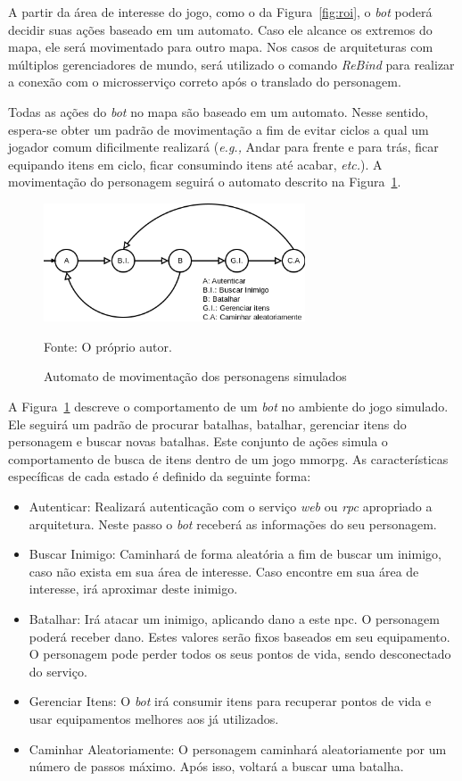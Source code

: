 A partir da área de interesse do jogo, como o da Figura~\ref{fig:roi}, o \textit{bot} poderá decidir suas ações baseado em um automato.
%
Caso ele alcance os extremos do mapa, ele será movimentado para outro mapa.
%
Nos casos de arquiteturas com múltiplos gerenciadores de mundo, será utilizado o comando \textit{ReBind} para realizar a conexão com o microsserviço correto após o translado do personagem.



Todas as ações do \textit{bot} no mapa são baseado em um automato.
%
Nesse sentido, espera-se obter um padrão de movimentação a fim de evitar ciclos a qual um jogador comum dificilmente realizará (\textit{e.g.,} Andar para frente e para trás, ficar equipando itens em ciclo, ficar consumindo itens até acabar, \textit{etc.}).
%
A movimentação do personagem seguirá o automato descrito na Figura~\ref{fig:movimentacao}.


\begin{figure}[htb!]
  \caption{Automato de movimentação dos personagens simulados}
  \label{fig:movimentacao}
  \includegraphics[height=3.5cm]{img/cap3/movimentacao.png}
  \centering

  Fonte: O próprio autor.
\end{figure}

A Figura~\ref{fig:movimentacao} descreve o comportamento de um \textit{bot} no ambiente do jogo simulado.
%
Ele seguirá um padrão de procurar batalhas, batalhar, gerenciar itens do personagem e buscar novas batalhas.
%
Este conjunto de ações simula o comportamento de busca de itens dentro de um jogo \ac{mmorpg}.
%
As características específicas de cada estado é definido da seguinte forma:

\begin{itemize}
  \item Autenticar: Realizará autenticação com o serviço \textit{web} ou \textit{rpc} apropriado a arquitetura. Neste passo o \textit{bot} receberá as informações do seu personagem.
  \item Buscar Inimigo: Caminhará de forma aleatória a fim de buscar um inimigo, caso não exista em sua área de interesse. Caso encontre em sua área de interesse, irá aproximar deste inimigo.
  \item Batalhar: Irá atacar um inimigo, aplicando dano a este \ac{npc}. O personagem poderá receber dano. Estes valores serão fixos baseados em seu equipamento. O personagem pode perder todos os seus pontos de vida, sendo desconectado do serviço.
  \item Gerenciar Itens: O \textit{bot} irá consumir itens para recuperar pontos de vida e usar equipamentos melhores aos já utilizados.
  \item Caminhar Aleatoriamente: O personagem caminhará aleatoriamente por um número de passos máximo. Após isso, voltará a buscar uma batalha.
\end{itemize}

